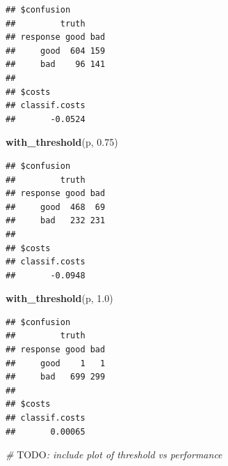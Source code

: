 \documentclass[]{article}
\newenvironment{Shaded}{\begin{snugshade}}{\end{snugshade}}
\newcommand{\AlertTok}[1]{\textcolor[rgb]{0.94,0.16,0.16}{#1}}
\newcommand{\CommentTok}[1]{\textcolor[rgb]{0.56,0.35,0.01}{\textit{#1}}}
\newcommand{\ControlFlowTok}[1]{\textcolor[rgb]{0.13,0.29,0.53}{\textbf{#1}}}
\newcommand{\DataTypeTok}[1]{\textcolor[rgb]{0.13,0.29,0.53}{#1}}
\newcommand{\FloatTok}[1]{\textcolor[rgb]{0.00,0.00,0.81}{#1}}
\newcommand{\KeywordTok}[1]{\textcolor[rgb]{0.13,0.29,0.53}{\textbf{#1}}}
\newcommand{\NormalTok}[1]{#1}
\newcommand{\OperatorTok}[1]{\textcolor[rgb]{0.81,0.36,0.00}{\textbf{#1}}}
\newcommand{\StringTok}[1]{\textcolor[rgb]{0.31,0.60,0.02}{#1}}
\renewenvironment{Shaded} {\begin{snugshade}\small} {\end{snugshade}}
\begin{document}
\begin{Shaded}
\end{Shaded}

\begin{verbatim}
## $confusion
##         truth
## response good bad
##     good  604 159
##     bad    96 141
## 
## $costs
## classif.costs 
##       -0.0524
\end{verbatim}

\begin{Shaded}
\begin{Highlighting}[]
\KeywordTok{with_threshold}\NormalTok{(p, }\FloatTok{0.75}\NormalTok{)}
\end{Highlighting}
\end{Shaded}

\begin{verbatim}
## $confusion
##         truth
## response good bad
##     good  468  69
##     bad   232 231
## 
## $costs
## classif.costs 
##       -0.0948
\end{verbatim}

\begin{Shaded}
\begin{Highlighting}[]
\KeywordTok{with_threshold}\NormalTok{(p, }\FloatTok{1.0}\NormalTok{)}
\end{Highlighting}
\end{Shaded}

\begin{verbatim}
## $confusion
##         truth
## response good bad
##     good    1   1
##     bad   699 299
## 
## $costs
## classif.costs 
##       0.00065
\end{verbatim}

\begin{Shaded}
\begin{Highlighting}[]
\CommentTok{# }\AlertTok{TODO}\CommentTok{: include plot of threshold vs performance}
\end{Highlighting}
\end{Shaded}
\end{document}
